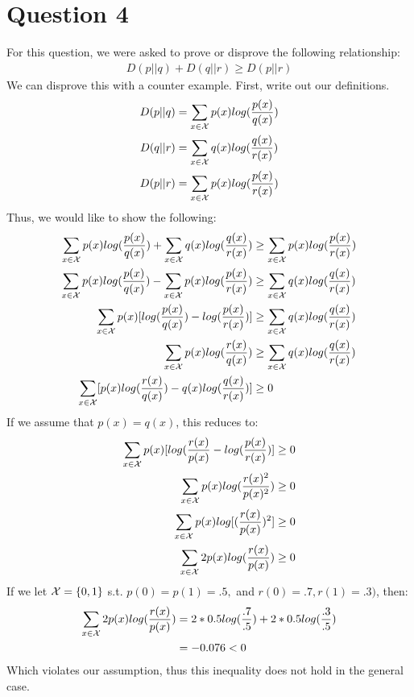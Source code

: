 \documentclass{article}
\begin{document}
\section{Question 4}
For this question, we were asked to prove or disprove the following relationship:
\begin{align*}
D(p||q) + D(q||r) \geq D(p||r)
\end{align*}
We can disprove this with a counter example.  First, write out our definitions.
\begin{align*}
D(p||q) &= \sum_{x \in  \mathcal{X}} p(x) log(\frac{p(x)}{q(x)})\\
D(q||r) &= \sum_{x \in  \mathcal{X}} q(x) log(\frac{q(x)}{r(x)})\\
D(p||r) &= \sum_{x \in  \mathcal{X}} p(x) log(\frac{p(x)}{r(x)})\\
\end{align*}
Thus, we would like to show the following:
\begin{align}
\sum_{x \in  \mathcal{X}} p(x) log(\frac{p(x)}{q(x)}) +  \sum_{x \in  \mathcal{X}} q(x) log(\frac{q(x)}{r(x)}) &\geq  \sum_{x \in  \mathcal{X}} p(x) log(\frac{p(x)}{r(x)})\\
\sum_{x \in  \mathcal{X}} p(x) log(\frac{p(x)}{q(x)}) -  \sum_{x \in  \mathcal{X}} p(x) log(\frac{p(x)}{r(x)}) &\geq \sum_{x \in  \mathcal{X}} q(x) log(\frac{q(x)}{r(x)})\\
\sum_{x \in  \mathcal{X}} p(x) [ log(\frac{p(x)}{q(x)}) - log(\frac{p(x)}{r(x)}) ] &\geq \sum_{x \in  \mathcal{X}} q(x) log(\frac{q(x)}{r(x)})\\
\sum_{x \in  \mathcal{X}} p(x) log(\frac{r(x)}{q(x)}) &\geq \sum_{x \in  \mathcal{X}} q(x) log(\frac{q(x)}{r(x)})\\
\sum_{x \in  \mathcal{X}} [ p(x) log(\frac{r(x)}{q(x)}) - q(x) log(\frac{q(x)}{r(x)}) ] &\geq 0
\end{align}
If we assume that $p(x) = q(x)$, this reduces to:
\begin{align}
\sum_{x \in  \mathcal{X}} p(x) [log(\frac{r(x)}{p(x)} - log(\frac{p(x)}{r(x)})] &\geq 0\\
\sum_{x \in  \mathcal{X}} p(x) log(\frac{r(x)^2}{p(x)^2}) &\geq 0\\
\sum_{x \in  \mathcal{X}} p(x) log[ (\frac{r(x)}{p(x)})^2 ] &\geq 0\\
\sum_{x \in  \mathcal{X}} 2p(x) log(\frac{r(x)}{p(x)}) &\geq 0\\
\end{align}
If we let $ \mathcal{X} = \{0,1\}$ s.t. $p(0) = p(1) = .5,$ and $r(0) = .7, r(1) = .3)$, then:
\begin{align*}
\sum_{x \in  \mathcal{X}} 2p(x) log(\frac{r(x)}{p(x)}) &= 2*0.5log(\frac{.7}{.5}) + 2*0.5log(\frac{.3}{.5})\\
&= -0.076 < 0
\end{align*}
Which violates our assumption, thus this inequality does not hold in the general case.  \QED


\end{document}
